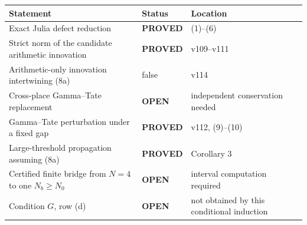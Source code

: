 \documentclass[11pt]{article}
\newcommand{\PROVED}{\textcolor{green!40!black}{\textbf{PROVED}}}
\newcommand{\OPEN}{\textcolor{red!70!black}{\textbf{OPEN}}}
\begin{document}
\begin{center}
\begin{tabular}{>{\raggedright\arraybackslash}p{.55\linewidth}
                >{\centering\arraybackslash}p{.15\linewidth}
                >{\raggedright\arraybackslash}p{.20\linewidth}}
\toprule
Statement & Status & Location \\
\midrule
Exact Julia defect reduction & \PROVED & (1)--(6) \\
Strict norm of the candidate arithmetic innovation & \PROVED & v109--v111 \\
Arithmetic-only innovation intertwining (8a) & false & v114 \\
Cross-place Gamma--Tate replacement & \OPEN & independent conservation needed \\
Gamma--Tate perturbation under a fixed gap & \PROVED & v112, (9)--(10) \\
Large-threshold propagation assuming (8a) & \PROVED & Corollary 3 \\
Certified finite bridge from $N=4$ to one $N_b\ge N_0$ & \OPEN & interval computation required \\
Condition $G$, row (d) & \OPEN & not obtained by this conditional induction \\
\bottomrule
\end{tabular}
\end{center}
\end{document}
